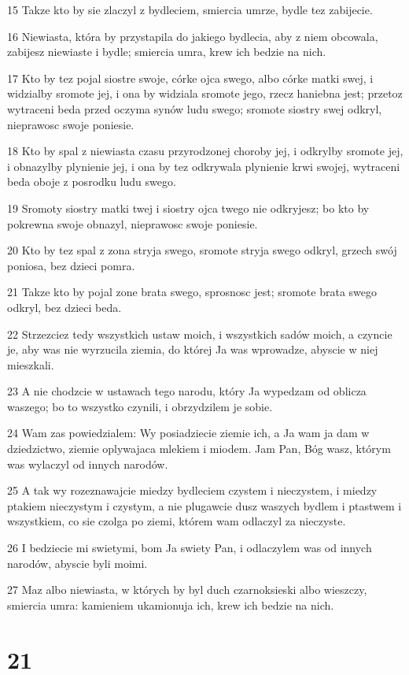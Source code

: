 \par 15 Takze kto by sie zlaczyl z bydleciem, smiercia umrze, bydle tez zabijecie.
\par 16 Niewiasta, która by przystapila do jakiego bydlecia, aby z niem obcowala, zabijesz niewiaste i bydle; smiercia umra, krew ich bedzie na nich.
\par 17 Kto by tez pojal siostre swoje, córke ojca swego, albo córke matki swej, i widzialby sromote jej, i ona by widziala sromote jego, rzecz haniebna jest; przetoz wytraceni beda przed oczyma synów ludu swego; sromote siostry swej odkryl, nieprawosc swoje poniesie.
\par 18 Kto by spal z niewiasta czasu przyrodzonej choroby jej, i odkrylby sromote jej, i obnazylby plynienie jej, i ona by tez odkrywala plynienie krwi swojej, wytraceni beda oboje z posrodku ludu swego.
\par 19 Sromoty siostry matki twej i siostry ojca twego nie odkryjesz; bo kto by pokrewna swoje obnazyl, nieprawosc swoje poniesie.
\par 20 Kto by tez spal z zona stryja swego, sromote stryja swego odkryl, grzech swój poniosa, bez dzieci pomra.
\par 21 Takze kto by pojal zone brata swego, sprosnosc jest; sromote brata swego odkryl, bez dzieci beda.
\par 22 Strzezciez tedy wszystkich ustaw moich, i wszystkich sadów moich, a czyncie je, aby was nie wyrzucila ziemia, do której Ja was wprowadze, abyscie w niej mieszkali.
\par 23 A nie chodzcie w ustawach tego narodu, który Ja wypedzam od oblicza waszego; bo to wszystko czynili, i obrzydzilem je sobie.
\par 24 Wam zas powiedzialem: Wy posiadziecie ziemie ich, a Ja wam ja dam w dziedzictwo, ziemie oplywajaca mlekiem i miodem. Jam Pan, Bóg wasz, którym was wylaczyl od innych narodów.
\par 25 A tak wy rozeznawajcie miedzy bydleciem czystem i nieczystem, i miedzy ptakiem nieczystym i czystym, a nie plugawcie dusz waszych bydlem i ptastwem i wszystkiem, co sie czolga po ziemi, którem wam odlaczyl za nieczyste.
\par 26 I bedziecie mi swietymi, bom Ja swiety Pan, i odlaczylem was od innych narodów, abyscie byli moimi.
\par 27 Maz albo niewiasta, w których by byl duch czarnoksieski albo wieszczy, smiercia umra: kamieniem ukamionuja ich, krew ich bedzie na nich.

\chapter{21}

